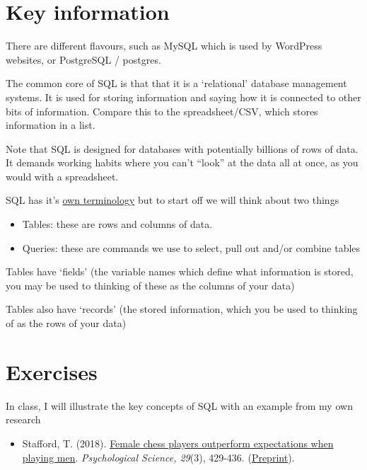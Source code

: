 \documentclass[
]{book}
\providecommand{\tightlist}{%
  \setlength{\itemsep}{0pt}\setlength{\parskip}{0pt}}
\begin{document}
\hypertarget{key-information}{%
\section{Key information}\label{key-information}}

There are different flavours, such as MySQL which is used by WordPress websites, or PostgreSQL / postgres.

The common core of SQL is that that it is a `relational' database management systems. It is used for storing information and saying how it is connected to other bits of information. Compare this to the spreadsheet/CSV, which stores information in a list.

Note that SQL is designed for databases with potentially billions of rows of data. It demands working habits where you can't ``look'' at the data all at once, as you would with a spreadsheet.

SQL has it's \href{https://en.wikipedia.org/wiki/SQL_syntax}{own terminology} but to start off we will think about two things

\begin{itemize}
\tightlist
\item
  Tables: these are rows and columns of data.
\item
  Queries: these are commands we use to select, pull out and/or combine tables
\end{itemize}

Tables have `fields' (the variable names which define what information is stored, you may be used to thinking of these as the columns of your data)

Tables also have `records' (the stored information, which you be used to thinking of as the rows of your data)

\hypertarget{exercises-7}{%
\section{Exercises}\label{exercises-7}}

In class, I will illustrate the key concepts of SQL with an example from my own research

\begin{itemize}
\tightlist
\item
  Stafford, T. (2018). \href{http://journals.sagepub.com/doi/10.1177/0956797617736887}{Female chess players outperform expectations when playing men}. \emph{Psychological Science, 29}(3), 429-436. (\href{https://psyarxiv.com/bpy3t/}{Preprint}).
\end{itemize}
\end{document}

